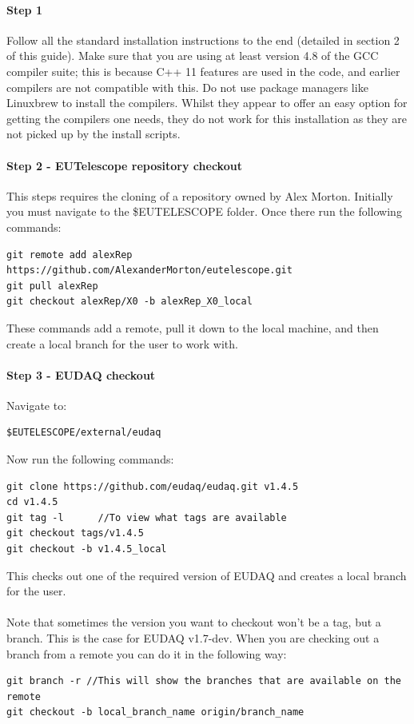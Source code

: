 \documentclass[11pt]{article}
\begin{document}
\paragraph{Step 1}
Follow all the standard installation instructions to the end (detailed in section 2 of this guide). Make sure that you are using at least version 4.8 of the GCC compiler suite; this is because C++ 11 features are used in the code, and earlier compilers are not compatible with this. Do not use package managers like Linuxbrew to install the compilers. Whilst they appear to offer an easy option for getting the compilers one needs, they do not work for this installation as they are not picked up by the install scripts.
\paragraph{Step 2 - EUTelescope repository checkout}
This steps requires the cloning of a repository owned by Alex Morton. Initially you must navigate to the \$EUTELESCOPE folder. Once there run the following commands:
\begin{verbatim}
git remote add alexRep https://github.com/AlexanderMorton/eutelescope.git
git pull alexRep
git checkout alexRep/X0 -b alexRep_X0_local
\end{verbatim}
These commands add a remote, pull it down to the local machine, and then create a local branch for the user to work with.
\paragraph{Step 3 - EUDAQ checkout}
Navigate to:
\begin{verbatim}
$EUTELESCOPE/external/eudaq
\end{verbatim}
Now run the following commands:
\begin{verbatim}
git clone https://github.com/eudaq/eudaq.git v1.4.5
cd v1.4.5
git tag -l  	//To view what tags are available
git checkout tags/v1.4.5
git checkout -b v1.4.5_local
\end{verbatim}
This checks out one of the required version of EUDAQ and creates a local branch for the user.
\paragraph{}
Note that sometimes the version you want to checkout won't be a tag, but a branch. This is the case for EUDAQ v1.7-dev. When you are checking out a branch from a remote you can do it in the following way:
\begin{verbatim}
git branch -r //This will show the branches that are available on the remote
git checkout -b local_branch_name origin/branch_name
\end{verbatim}
\end{document}
